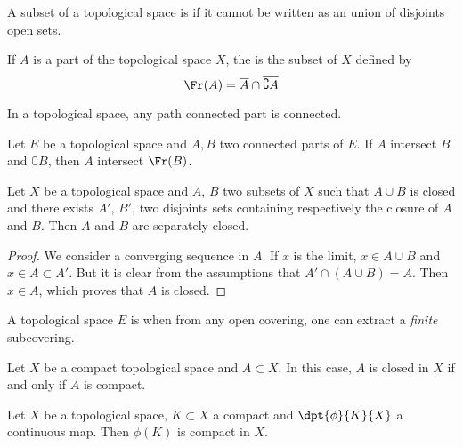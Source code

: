 \begin{definition}
A subset of a topological space is  if it cannot be written as an union of disjoints open sets.
\end{definition}

If $A$ is a part of the topological space $X$, the  is the subset of $X$ defined by
\[
   \Fr(A)=\overline{A}\cap\overline{\complement A}
\]

\begin{lemma}
In a topological space, any path connected part is connected.
\end{lemma}

\begin{theorem}
Let $E$ be a topological space and $A,B$ two connected parts of $E$. If $A$ intersect $B$ and $\complement B$, then $A$ intersect $\Fr(B)$.\label{tho:doine}
\end{theorem}


\begin{proposition}
Let $X$ be a topological space and $A$, $B$ two subsets of $X$ such that $A\cup B$ is closed and there exists $A'$, $B'$, two disjoints sets containing respectively the closure of $A$ and $B$. Then $A$ and $B$ are separately closed.\label{prop:sep_ferme}
\end{proposition}

\begin{proof}
We consider a converging sequence in $A$. If $x$ is the limit, $x\in A\cup B$ and $x\in\overline{A}\subset A'$. But it is clear from the assumptions that $A'\cap(A\cup B)=A$. Then $x\in A$, which proves that $A$ is closed.
\end{proof}

\begin{definition}
A topological space $E$ is  when from any open covering, one can extract a \emph{finite} subcovering. \label{def:compact}
\end{definition}

\begin{lemma}
Let $X$ be a compact topological space and $A\subset X$. In this case, $A$ is closed in $X$ if and only if $A$ is compact.
 \label{lem:ferme_compact}
\end{lemma}

\begin{proposition}
Let $X$ be a topological space, $K\subset X$ a compact and $\dpt{\phi}{K}{X}$ a continuous map. Then $\phi(K)$ is compact in $X$.
\end{proposition}

